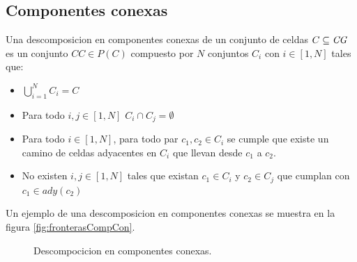 \subsection{Componentes conexas} \label{subsec:CompComp}
Una descomposicion en componentes conexas de un conjunto de
celdas $C \subseteq \mathit{CG}$ es un conjunto $CC\in P(C)$ compuesto por $N$ conjuntos $C_i$ con
$i\in[1,N]$ tales que:
\begin{itemize}
  \item $\bigcup_{i=1}^{N}C_i = C$ 
  \item Para todo $i,j \in [1,N]$ $C_i\cap C_j = \emptyset$
  \item Para todo $i \in [1,N]$, para todo par $c_1,c_2 \in C_i$ se cumple que existe un camino de celdas adyacentes en $C_i$ que llevan desde $c_1$ a $c_2$.
  \item No existen $i,j \in [1,N]$ tales que existan $c_1 \in C_i$ y $c_2 \in C_j$ que cumplan con $c_1 \in ady(c_2)$ 
\end{itemize}

Un ejemplo de una descomposicion en componentes conexas se muestra en la figura \ref{fig:fronterasCompCon}.

\begin{figure}[H]
  \centering
  \qquad

  \caption{Descompocicion en componentes conexas.}\label{fig:descCompCon}
\end{figure}

